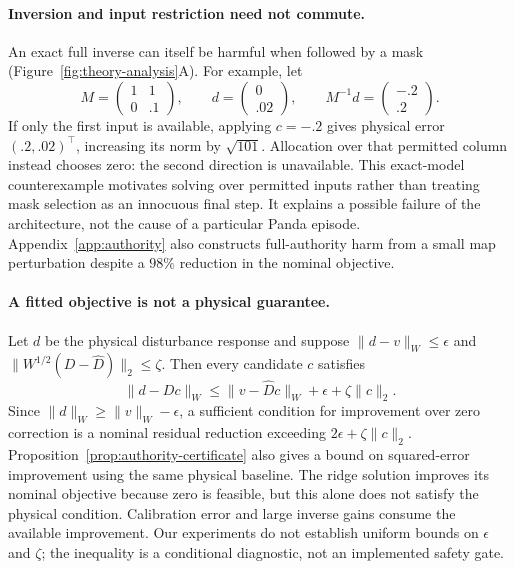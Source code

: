 \documentclass{article}
\begin{document}
\paragraph{Inversion and input restriction need not commute.}
An exact full inverse can itself be harmful when followed by a mask
(Figure~\ref{fig:theory-analysis}A). For example, let
\[
 M=\begin{pmatrix}1&1\\0&.1\end{pmatrix},\qquad
 d=\begin{pmatrix}0\\.02\end{pmatrix},\qquad
 M^{-1}d=\begin{pmatrix}-.2\\.2\end{pmatrix}.
\]
If only the first input is available, applying $c=-.2$ gives physical error
$(.2,.02)^\top$, increasing its norm by $\sqrt{101}$. Allocation over that permitted column
instead chooses zero: the second direction is unavailable. This exact-model counterexample
motivates solving over permitted inputs rather than treating mask selection as an innocuous
final step. It explains a possible failure of the architecture, not the cause of a particular
Panda episode. Appendix~\ref{app:authority} also constructs full-authority harm from a small
map perturbation despite a $98\%$ reduction in the nominal objective.

\paragraph{A fitted objective is not a physical guarantee.}
Let $d$ be the physical disturbance response and suppose
$\|d-v\|_W\le\epsilon$ and $\|W^{1/2}(D-\widehat D)\|_2\le\zeta$. Then every candidate $c$
satisfies
\begin{equation}\label{eq:main-bound}
 \|d-Dc\|_W\le\|v-\widehat D c\|_W+\epsilon+\zeta\|c\|_2.
\end{equation}
Since $\|d\|_W\ge\|v\|_W-\epsilon$, a sufficient condition for improvement over zero
correction is a nominal residual reduction exceeding $2\epsilon+\zeta\|c\|_2$.
Proposition~\ref{prop:authority-certificate} also gives a bound on squared-error improvement
using the same physical baseline. The ridge solution improves its nominal objective because zero is feasible, but this alone
does not satisfy the physical condition. Calibration error and large inverse gains consume
the available improvement. Our experiments do not establish uniform bounds on $\epsilon$
and $\zeta$; the inequality is a conditional diagnostic, not an implemented safety gate.
\end{document}
